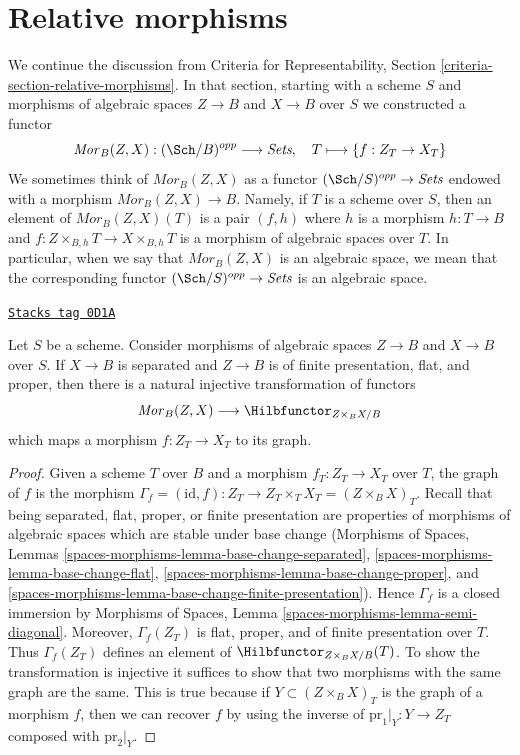 \section{Relative morphisms}
\label{quot-section-relative-morphisms}
We continue the discussion from Criteria for Representability, Section
\ref{criteria-section-relative-morphisms}.
In that section, starting with a scheme $S$ and morphisms
of algebraic spaces $Z \to B$ and $X \to B$ over $S$
we constructed a functor
$$
\mathit{Mor}_B(Z, X) : (\Sch/B)^{opp} \longrightarrow \textit{Sets}, \quad
T \longmapsto \{f : Z_T \to X_T\}
$$
We sometimes think of $\mathit{Mor}_B(Z, X)$
as a functor $(\Sch/S)^{opp} \to \textit{Sets}$ endowed with a morphism
$\mathit{Mor}_B(Z, X) \to B$.
Namely, if $T$ is a scheme over $S$, then an element
of $\mathit{Mor}_B(Z, X)(T)$ is a pair $(f, h)$
where $h$ is a morphism $h : T \to B$
and $f : Z \times_{B, h} T \to X \times_{B, h} T$
is a morphism of algebraic spaces over $T$. In particular, when we say
that $\mathit{Mor}_B(Z, X)$ is an algebraic space, we mean that the
corresponding functor $(\Sch/S)^{opp} \to \textit{Sets}$ is an algebraic space.

\begin{lemma}
\label{quot-lemma-Mor-into-Hilb}
\href{https://stacks.math.columbia.edu/tag/0D1A}{\texttt{Stacks tag 0D1A}}

Let $S$ be a scheme. Consider morphisms
of algebraic spaces $Z \to B$ and $X \to B$ over $S$.
If $X \to B$ is separated and $Z \to B$ is
of finite presentation, flat, and proper,
then there is a natural
injective transformation of functors
$$
\mathit{Mor}_B(Z, X) \longrightarrow \Hilbfunctor_{Z \times_B X/B}
$$
which maps a morphism $f : Z_T \to X_T$ to its graph.
\end{lemma}

\begin{proof}
Given a scheme $T$ over $B$ and a morphism $f_T : Z_T \to X_T$
over $T$, the graph of $f$ is the morphism
$\Gamma_f = (\text{id}, f) : Z_T \to Z_T \times_T X_T = (Z \times_B X)_T$.
Recall that being separated, flat, proper, or finite presentation
are properties of morphisms of algebraic spaces which are stable
under base change (Morphisms of Spaces, Lemmas
\ref{spaces-morphisms-lemma-base-change-separated},
\ref{spaces-morphisms-lemma-base-change-flat},
\ref{spaces-morphisms-lemma-base-change-proper}, and
\ref{spaces-morphisms-lemma-base-change-finite-presentation}).
Hence $\Gamma_f$ is a closed immersion by
Morphisms of Spaces, Lemma \ref{spaces-morphisms-lemma-semi-diagonal}.
Moreover, $\Gamma_f(Z_T)$ is flat, proper, and of finite presentation over $T$.
Thus $\Gamma_f(Z_T)$ defines an element of $\Hilbfunctor_{Z \times_B X/B}(T)$.
To show the transformation is injective it suffices to show that
two morphisms with the same graph are the same. This is true because
if $Y \subset (Z \times_B X)_T$ is the graph of a morphism $f$, then
we can recover $f$ by using the inverse of $\text{pr}_1|_Y : Y \to Z_T$
composed with $\text{pr}_2|_Y$.
\end{proof}


